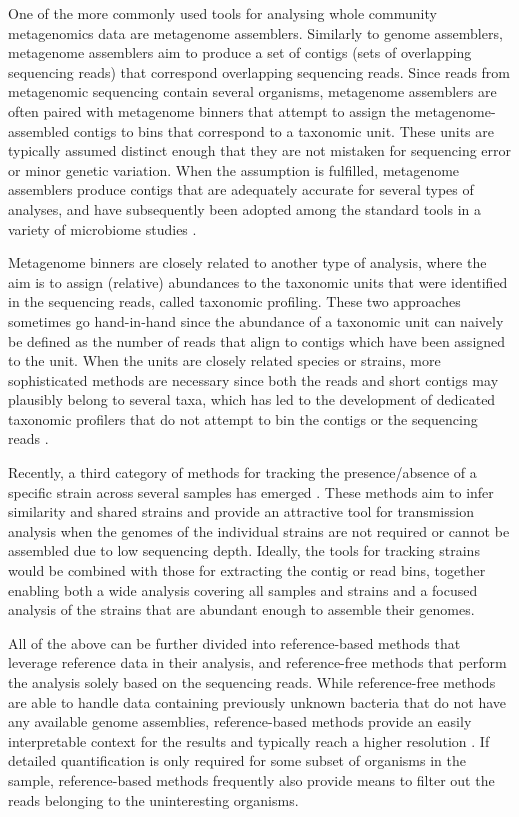 \documentclass[officiallayout]{tktla}
\begin{document}
One of the more commonly used tools for analysing whole community metagenomics
data are metagenome assemblers. Similarly to genome assemblers,
metagenome assemblers aim to produce a set of contigs (sets of
overlapping sequencing reads) that correspond overlapping sequencing
reads. Since reads from metagenomic sequencing contain several
organisms, metagenome assemblers are often paired with metagenome
binners that attempt to assign the metagenome-assembled contigs to
bins that correspond to a taxonomic unit. These units are typically
assumed distinct enough that they are not mistaken for sequencing
error or minor genetic variation. When the assumption is fulfilled,
metagenome assemblers produce contigs that are adequately accurate for
several types of analyses, and have subsequently been adopted among
the standard tools in a variety of microbiome studies
\citep{bertrand2019hybrid, somerville2019long, stewart2019compendium}.

Metagenome binners are closely related to another type of analysis,
where the aim is to assign (relative) abundances to the taxonomic
units that were identified in the sequencing reads, called taxonomic
profiling. These two approaches sometimes go hand-in-hand since the
abundance of a taxonomic unit can naively be defined as the number of
reads that align to contigs which have been assigned to the unit. When
the units are closely related species or strains, more sophisticated
methods are necessary since both the reads and short contigs may
plausibly belong to several taxa, which has led to the development of
dedicated taxonomic profilers that do not attempt to bin the contigs
or the sequencing reads \citep{beghini2021integrating,
  truong2017microbial, maklin_high-resolution_2021, van2022strainge}.

\vfill
\pagebreak
Recently, a third category of methods for tracking the
presence/absence of a specific strain across several samples has
emerged \citep{van2022strainge, truong2017microbial,
  nayfach2016integrated}. These methods aim to infer similarity and
shared strains and provide an attractive tool for transmission
analysis when the genomes of the individual strains are not
required or cannot be assembled due to low sequencing depth. Ideally,
the tools for tracking strains would be combined with those for
extracting the contig or read bins, together enabling both a wide
analysis covering all samples and strains and a focused analysis of
the strains that are abundant enough to assemble their genomes.

All of the above can be further divided into reference-based methods
that leverage reference data in their analysis, and reference-free
methods that perform the analysis solely based on the sequencing
reads. While reference-free methods are able to handle data containing
previously unknown bacteria that do not have any available genome
assemblies, reference-based methods provide an easily interpretable
context for the results and typically reach a higher resolution
\citep{hiraoka2016metagenomics, thomas2012metagenomics}. If detailed
quantification is only required for some subset of organisms in the
sample, reference-based methods frequently also provide means to
filter out the reads belonging to the uninteresting organisms.
\end{document}
